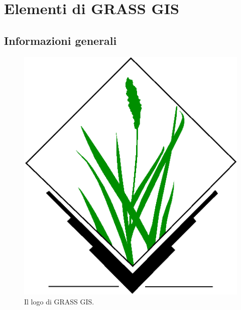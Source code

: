 \chapter{Elementi di GRASS GIS}

\section{Informazioni generali%
}

	\begin{figure}
		\centering
		\includegraphics[scale=0.15]{img/Grasslogo_vector_big}\par
		\caption{{\small Il logo di GRASS GIS.}}
	\end{figure}

